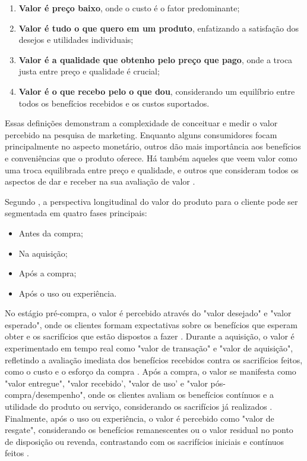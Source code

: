 \begin{enumerate}
    \item \textbf{Valor é preço baixo}, onde o custo é o fator predominante;
    \item \textbf{Valor é tudo o que quero em um produto}, enfatizando a satisfação dos desejos e utilidades individuais;
    \item \textbf{Valor é a qualidade que obtenho pelo preço que pago}, onde a troca justa entre preço e qualidade é crucial;
    \item \textbf{Valor é o que recebo pelo o que dou}, considerando um equilíbrio entre todos os benefícios recebidos e os custos suportados.
\end{enumerate}

Essas definições demonstram a complexidade de conceituar e medir o valor percebido na pesquisa de marketing. Enquanto alguns consumidores focam principalmente no aspecto monetário, outros dão mais importância aos benefícios e conveniências que o produto oferece. Há também aqueles que veem valor como uma troca equilibrada entre preço e qualidade, e outros que consideram todos os aspectos de dar e receber na sua avaliação de valor \parencite{ARTICLE10}.

Segundo \textcite{ARTICLE10}, a perspectiva longitudinal do valor do produto para o cliente pode ser segmentada em quatro fases principais: 

\begin{itemize}
    \item Antes da compra;
    \item Na aquisição;
    \item Após a compra;
    \item Após o uso ou experiência.
\end{itemize}

No estágio pré-compra, o valor é percebido através do "valor desejado" e "valor esperado", onde os clientes formam expectativas sobre os benefícios que esperam obter e os sacrifícios que estão dispostos a fazer \parencite{ARTICLE10}. Durante a aquisição, o valor é experimentado em tempo real como "valor de transação" e "valor de aquisição", refletindo a avaliação imediata dos benefícios recebidos contra os sacrifícios feitos, como o custo e o esforço da compra \parencite{ARTICLE10}. Após a compra, o valor se manifesta como "valor entregue", "valor recebido', "valor de uso' e "valor pós-compra/desempenho", onde os clientes avaliam os benefícios contínuos e a utilidade do produto ou serviço, considerando os sacrifícios já realizados \parencite{ARTICLE10}. Finalmente, após o uso ou experiência, o valor é percebido como "valor de resgate", considerando os benefícios remanescentes ou o valor residual no ponto de disposição ou revenda, contrastando com os sacrifícios iniciais e contínuos feitos \parencite{ARTICLE10}. 


